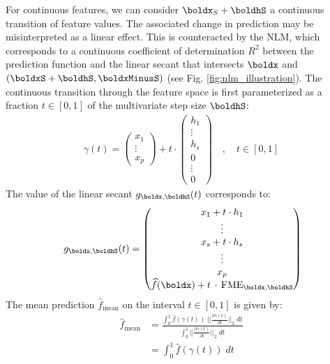 For continuous features, we can consider $\boldx_S + \boldhS$ a continuous transition of feature values. The associated change in prediction may be misinterpreted as a linear effect. This is counteracted by the NLM, which corresponds to a continuous coefficient of determination $R^2$ between the prediction function and the linear secant that intersects $\boldx$ and $(\boldxS + \boldhS, \boldxMinusS)$ (see Fig. \ref{fig:nlm_illustration}). The continuous transition through the feature space is first parameterized as a fraction $t \in [0, 1]$ of the multivariate step size $\boldhS$:
\begin{align*}
    \gamma(t) = \begin{pmatrix} x_1 \\ \vdots \\ x_p \end{pmatrix} + t \cdot \begin{pmatrix} h_1 \\ \vdots \\ h_s \\ 0 \\ \vdots \\ 0  \end{pmatrix}
    \quad  , \quad t \in [0, 1] 
\end{align*}
The value of the linear secant $g_{\boldx, \boldhS}(t)$ corresponds to:
\begin{align*}
&\phantom{{}={}} g_{\boldx, \boldhS}(t) = \begin{pmatrix} x_1 + t \cdot h_1 \\ \vdots \\ x_s + t \cdot h_s \\ \vdots \\ x_p \\ \widehat{f}(\boldx) + t \, \cdot \, \text{FME}_{\boldx, \boldhS} \end{pmatrix} 
\end{align*}
The mean prediction $\widehat{f}_{\text{mean}}$ on the interval $t \in [0, 1]$ is given by: 
\begin{align*}
    \widehat{f}_{\text{mean}} &= \frac{\int_0^1 \widehat{f}(\gamma(t)) \; \Big\vert \Big\vert \frac{\partial \gamma(t)}{\partial t}\Big\vert \Big\vert_2 \;dt}{\int_0^1 \Big\vert \Big\vert \frac{\partial \gamma(t)}{\partial t} \Big\vert \Big\vert_2 \; dt}  \\
    &= \int_0^1 \widehat{f}(\gamma(t)) \;dt
\end{align*}
